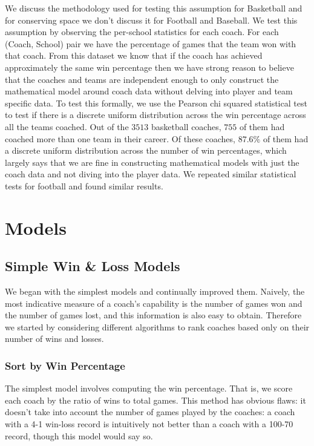 \documentclass[11pt,notitlepage]{article}
\begin{document}
\noindent We discuss the methodology used for testing this assumption for Basketball and for conserving space we don't discuss it for Football and Baseball. We test this assumption by observing the per-school statistics for each coach. For each (Coach, School) pair we have the percentage of games that the team won with that coach. From this dataset we know that if the coach has achieved approximately the same win percentage then we have strong reason to believe that the coaches and teams are independent enough to only construct the mathematical model around coach data without delving into player and team specific data. To test this formally, we use the Pearson chi squared statistical test to test if there is a discrete uniform distribution across the win percentage across all the teams coached. Out of the $3513$ basketball coaches, $755$ of them had coached more than one team in their career. Of these coaches, $87.6\%$ of them had a discrete uniform distribution across the number of win percentages, which largely says that we are fine in constructing mathematical models with just the coach data and not diving into the player data. We repeated similar statistical tests for football and found similar results.

\section{Models}

\subsection{Simple Win \& Loss Models}

We began with the simplest models and continually improved them. Naively, the most indicative measure of a coach's capability is the number of games won and the number of games lost, and this information is also easy to obtain. Therefore we started by considering different algorithms to rank coaches based only on their number of wins and losses.

\subsubsection{Sort by Win Percentage}
The simplest model involves computing the win percentage. That is, we score each coach by the ratio of wins to total games. This method has obvious flaws: it doesn't take into account the number of games played by the coaches: a coach with a 4-1 win-loss record is intuitively not better than a coach with a 100-70 record, though this model would say so.
\end{document}
